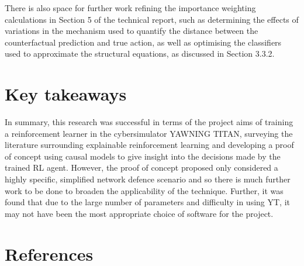 \documentclass{article}
\begin{document}
There is also space for further work refining the importance weighting calculations in Section 5 of the technical report, such as determining the effects of variations in the mechanism used to quantify the distance between the counterfactual prediction and true action, as well as optimising the classifiers used to approximate the structural equations, as discussed in Section 3.3.2.







\section{Key takeaways}
In summary, this research was successful in terms of the project aims of training a reinforcement learner in the cybersimulator YAWNING TITAN, surveying the literature surrounding explainable reinforcement learning and developing a proof of concept using causal models to give insight into the decisions made by the trained RL agent. However, the proof of concept proposed only considered a highly specific, simplified network defence scenario and so there is much further work to be done to broaden the applicability of the technique. Further, it was found that due to the large number of parameters and difficulty in using YT, it may not have been the most appropriate choice of software for the project. 


\pagebreak


\section{References}
%
%


\printbibliography[heading=none, stylename = plain]
\end{document}
